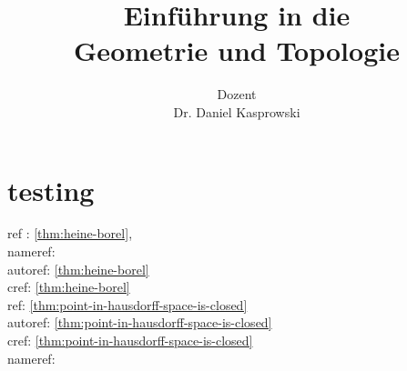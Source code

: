 \documentclass[a4paper,german]{article}
\title{{Einführung in die} \\ Geometrie und Topologie}
\author{{\normalfont Dozent}\\{\sc Dr. Daniel Kasprowski}}
\begin{document}
    \maketitle
    \section{testing}
    ref : \ref{thm:heine-borel}, \\
nameref:    \\
autoref: \autoref{thm:heine-borel} \\
cref: \cref{thm:heine-borel} \\
ref: \ref{thm:point-in-hausdorff-space-is-closed} \\
autoref:    \autoref{thm:point-in-hausdorff-space-is-closed} \\
cref:    \cref{thm:point-in-hausdorff-space-is-closed} \\
nameref:     \\
\listoftheorems
    \tableofcontents
    
    
    
    
    
\end{document}
